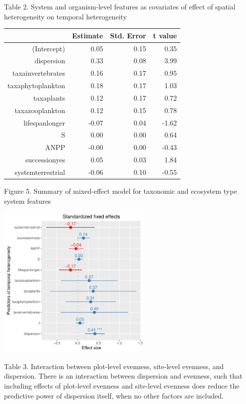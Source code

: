 \documentclass[11pt]{article}
\begin{document}
Table 2. System and organism-level features as covariates of effect of spatial heterogeneity on temporal heterogeneity

\FloatBarrier
\begin{table}[ht]
\centering
\begin{tabular}{rrrr}
  \hline
 & Estimate & Std. Error & t value \\ 
  \hline
(Intercept) & 0.05 & 0.15 & 0.35 \\ 
  dispersion & 0.33 & 0.08 & 3.99 \\ 
  taxainvertebrates & 0.16 & 0.17 & 0.95 \\ 
  taxaphytoplankton & 0.18 & 0.17 & 1.03 \\ 
  taxaplants & 0.12 & 0.17 & 0.72 \\ 
  taxazooplankton & 0.12 & 0.15 & 0.78 \\ 
  lifespanlonger & -0.07 & 0.04 & -1.62 \\ 
  S & 0.00 & 0.00 & 0.64 \\ 
  ANPP & -0.00 & 0.00 & -0.43 \\ 
  successionyes & 0.05 & 0.03 & 1.84 \\ 
  systemterrestrial & -0.06 & 0.10 & -0.55 \\ 
   \hline
\end{tabular}
\end{table}
\FloatBarrier


Figure 5. Summary of mixed-effect model for taxonomic and ecosystem type system features 

\includegraphics[width=280px]{systemmodel}


Table 3. Interaction between plot-level evenness, site-level evenness, and dispersion. There is an interaction between dispersion and evenness, such that including effects of plot-level evenness and site-level evenness does reduce the predictive power of dispersion itself, when no other factors are included. 
\end{document}
